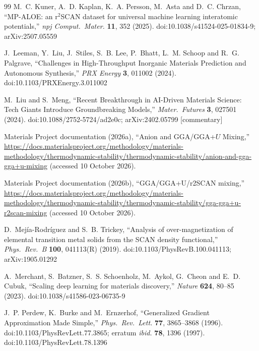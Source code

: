 \documentclass[11pt]{article}
\begin{document}
\begin{thebibliography}{99}
 M.~C. Kuner, A.~D. Kaplan, K.~A. Persson, M.~Asta
and D.~C. Chrzan, ``MP-ALOE: an r$^2$SCAN dataset for universal machine learning
interatomic potentials,'' \emph{npj Comput.~Mater.} \textbf{11}, 352 (2025).
doi:10.1038/s41524-025-01834-9; arXiv:2507.05559

 J.~Leeman, Y.~Liu, J.~Stiles, S.~B. Lee,
P.~Bhatt, L.~M. Schoop and R.~G. Palgrave, ``Challenges in High-Throughput Inorganic
Materials Prediction and Autonomous Synthesis,'' \emph{PRX Energy} \textbf{3}, 011002
(2024). doi:10.1103/PRXEnergy.3.011002

 M.~Liu and S.~Meng, ``Recent Breakthrough in
AI-Driven Materials Science: Tech Giants Introduce Groundbreaking Models,''
\emph{Mater.~Futures} \textbf{3}, 027501 (2024). doi:10.1088/2752-5724/ad2e0c;
arXiv:2402.05799 [commentary]

 Materials Project documentation (2026a),
``Anion and GGA/GGA+$U$ Mixing,'' \url{https://docs.materialsproject.org/methodology/materials-methodology/thermodynamic-stability/thermodynamic-stability/anion-and-gga-gga+u-mixing} (accessed 10 October 2026).

 Materials Project documentation (2026b),
``GGA/GGA+U/r2SCAN mixing,'' \url{https://docs.materialsproject.org/methodology/materials-methodology/thermodynamic-stability/thermodynamic-stability/gga-gga+u-r2scan-mixing} (accessed 10 October 2026).

 D.~Mej\'ia-Rodr\'iguez and
S.~B. Trickey, ``Analysis of over-magnetization of elemental transition metal solids from
the SCAN density functional,'' \emph{Phys.~Rev.~B} \textbf{100}, 041113(R) (2019).
doi:10.1103/PhysRevB.100.041113; arXiv:1905.01292

 A.~Merchant, S.~Batzner, S.~S. Schoenholz,
M.~Aykol, G.~Cheon and E.~D. Cubuk, ``Scaling deep learning for materials discovery,''
\emph{Nature} \textbf{624}, 80--85 (2023). doi:10.1038/s41586-023-06735-9

 J.~P. Perdew, K.~Burke and M.~Ernzerhof,
``Generalized Gradient Approximation Made Simple,'' \emph{Phys.~Rev.~Lett.} \textbf{77},
3865--3868 (1996). doi:10.1103/PhysRevLett.77.3865; erratum \emph{ibid.} \textbf{78}, 1396
(1997). doi:10.1103/PhysRevLett.78.1396


\end{thebibliography}
\end{document}
